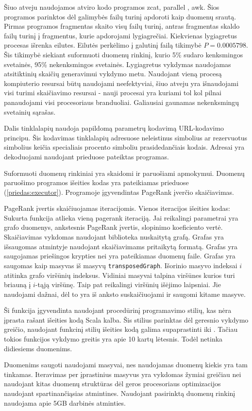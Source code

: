 Šiuo atveju naudojamos atviro kodo programos zcat, parallel \cite{parallel}, awk. Šios programos parinktos
dėl galimybės failų turinį apdoroti kaip duomenų srautą. Pirmas programos fragmentas skaito visų failų turinį,
antras fragmentas skaldo failų turinį į fragmentus, kurie apdorojami lygiagrečiai. Kiekvienas lygiagretus procesas
išrenka eilutes. Eilutės perkėlimo į galutinį failą tikimybė $P = 0.0005798$. Šis tikimybė siekiant suformuoti
duomenų rinkinį, kurio 5\% sudaro kenksmingos svetainės, 95\% nekenksmingos svetainės. Lygiagretus vykdymas
naudojamas atsitiktinių skaičių generavimui vykdymo metu. Naudojant vieną procesą kompiuterio resursai būtų
naudojami neefektyviai, šiuo atveju yra išnaudojami visi turimi skaičiavimo resursai - nauji procesai yra
kuriami tol kol pilnai panaudojami visi procesoriaus branduoliai. Galiausiai gaunamas nekenksmingų svetainių
sąrašas.

Dalis tinklalapių naudoja papildomą parametrų kodavimą URL-kodavimo principu. Šis kodavimas tinklalapių adresuose
neleistinus simbolius ar rezervuotus simbolius keičia specialiais procento simboliu prasidedančiais kodais.
Adresai yra dekoduojami naudojant prieduose pateiktas programas.


Suformuoti duomenų rinkiniai yra skaidomi ir paruošiami apmokymui. Duomenų paruošimo programos išeities
kodas yra pateikiamas prieduose (\ref{priedas:executor}). Programoje įgyvendintas PageRank įverčio skaičiavimas.

PageRank įvertis skaičiuojamas iteracijomis. Vienos iteracijos išeities kodas:
Sukurta funkcija atlieka vieną pagerank iteraciją. Jai reikalingi  parametrai yra grafo duomenys, ankstesnis
PageRank įvertis, slopinimo koeficiento vertė. Skaičiavimas vykdomas naudojant biblioteka \cite{webgraph} nuskaitytą
grafą. Grafas yra išsaugomas atmintyje naudojant skaičiavimams pritaikytą formatą. Grafas yra saugojamas priešingos krypties nei yra pateikiamas duomenų faile. Grafas yra saugomas kaip masyvas iš masyvų \texttt{transposedGraph}. Išorinio masyvo indeksai $i$ atitinka
grafo viršūnių indeksus. Vidiniai masyvai talpina viršūnes kurios turi briauną į $i$-tąją viršūnę. Taip pat
reikalingi viršūnių išėjimo laipsniai. Jie naudojami dažnai, dėl to yra iš anksto suskaičiuojami ir saugomi kitame masyve.

Ši funkcija įgyvendinta naudojant procedūrinį programavimo stilių, kas nėra įprasta rašant išeities kodą Scala
kalba. Šis stilius parinktas dėl geresnio vykdymo greičio, naudojant funkcinį stilių išeities kodą galima
supaprastinti iki
.
Tačiau tokios funkcijos vykdymo greitis yra apie 10 kartų lėtesnis. Todėl netinka didiesiems duomenims.

Duomenims saugoti naudojami masyvai, nes naudojamas duomenų kiekis yra tam tinkamas. Iteravimas per
įprastinius masyvus yra vykdomas žymiai greičiau nei naudojant kitas duomenų struktūras dėl geros
procesoriaus optimizacijos naudojant spartinančiąsias atmintines. Naudojant pasirinktą duomenų
rinkinį naudojama apie 5GB darbinės atminties.